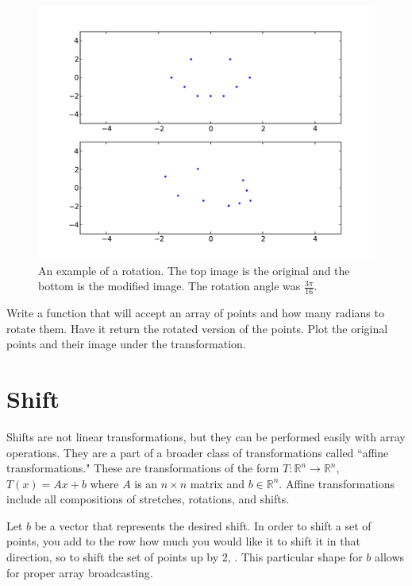 \begin{figure}[H]
\includegraphics[scale = .5]{rotate.pdf}
\caption{
An example of a rotation.
The top image is the original and the bottom is the modified image.
The rotation angle was $\frac{3\pi}{16}$.}
\end{figure}

\begin{problem}
Write a function that will accept an array of points and how many radians to rotate them.
Have it return the rotated version of the points.
Plot the original points and their image under the transformation.
\end{problem}

\section*{Shift}

Shifts are not linear transformations, but they can be performed easily with array operations.
They are a part of a broader class of transformations called ``affine transformations."
These are transformations of the form $T: \mathbb{R}^n \to \mathbb{R}^n$, $T(x) = A x + b$ where $A$ is an $n\times n$ matrix and $b \in \mathbb{R}^n$.
Affine transformations include all compositions of stretches, rotations, and shifts.

Let $b$ be a vector that represents the desired shift.
In order to shift a set of points, you add to the row how much you would like it to shift it in that direction, so to shift the set of points up by 2, .
This particular shape for $b$ allows for proper array broadcasting.


